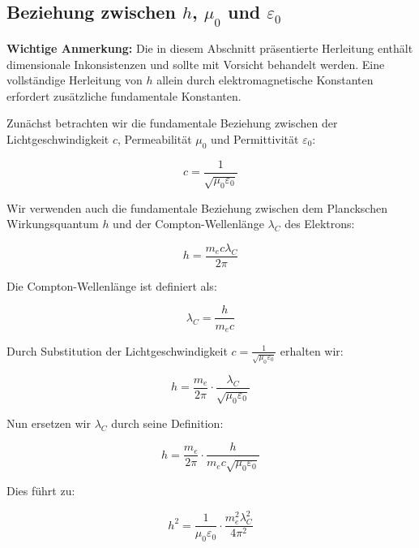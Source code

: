 \documentclass[12pt,a4paper]{article}
\begin{document}
	\subsection{Beziehung zwischen $h$, $\mu_0$ und $\varepsilon_0$}
	
	\textbf{Wichtige Anmerkung:} Die in diesem Abschnitt präsentierte Herleitung enthält dimensionale Inkonsistenzen und sollte mit Vorsicht behandelt werden. Eine vollständige Herleitung von $h$ allein durch elektromagnetische Konstanten erfordert zusätzliche fundamentale Konstanten.
	
	Zunächst betrachten wir die fundamentale Beziehung zwischen der Lichtgeschwindigkeit $c$, Permeabilität $\mu_0$ und Permittivität $\varepsilon_0$:
	
	\begin{equation}
		c = \frac{1}{\sqrt{\mu_0\varepsilon_0}}
	\end{equation}
	
	Wir verwenden auch die fundamentale Beziehung zwischen dem Planckschen Wirkungsquantum $h$ und der Compton-Wellenlänge $\lambda_C$ des Elektrons:
	
	\begin{equation}
		h = \frac{m_e c \lambda_C}{2\pi}
	\end{equation}
	
	Die Compton-Wellenlänge ist definiert als:
	
	\begin{equation}
		\lambda_C = \frac{h}{m_e c}
	\end{equation}
	
	Durch Substitution der Lichtgeschwindigkeit $c = \frac{1}{\sqrt{\mu_0\varepsilon_0}}$ erhalten wir:
	
	\begin{equation}
		h = \frac{m_e}{2\pi} \cdot \frac{\lambda_C}{\sqrt{\mu_0\varepsilon_0}}
	\end{equation}
	
	Nun ersetzen wir $\lambda_C$ durch seine Definition:
	
	\begin{equation}
		h = \frac{m_e}{2\pi} \cdot \frac{h}{m_e c \sqrt{\mu_0\varepsilon_0}}
	\end{equation}
	
	Dies führt zu:
	
	\begin{equation}
		h^2 = \frac{1}{\mu_0\varepsilon_0} \cdot \frac{m_e^2 \lambda_C^2}{4\pi^2}
	\end{equation}
	
\end{document}
